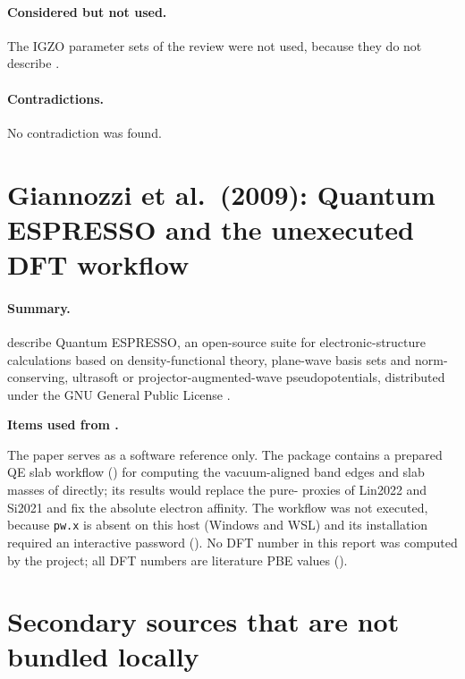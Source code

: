 \paragraph{Considered but not used.} The IGZO parameter sets of the review were not used, because
they do not describe \IWO.

\paragraph{Contradictions.} No contradiction was found.

\section{Giannozzi et al.\ (2009): Quantum ESPRESSO and the unexecuted DFT workflow}
\label{sec:lit-giannozzi2009}

\paragraph{Summary.}
\citet{Giannozzi2009} describe Quantum ESPRESSO, an open-source suite for electronic-structure
calculations \citep[p.~1]{Giannozzi2009} based on density-functional theory, plane-wave basis sets and
norm-conserving, ultrasoft or projector-augmented-wave pseudopotentials, distributed under the GNU
General Public License \citep[p.~2]{Giannozzi2009}.

\begin{usedbox}
\textbf{Items used from \citet{Giannozzi2009}.}\par\smallskip
\footnotesize
The paper serves as a software reference only. The package contains a prepared QE slab workflow
() for computing the vacuum-aligned band edges and slab masses of \IWO{} directly;
its results would replace the pure-\InO{} proxies of Lin2022 and Si2021 and fix the absolute electron
affinity. The workflow was not executed, because \texttt{pw.x} is absent on this host (Windows and
WSL) and its installation required an interactive password (). No DFT
number in this report was computed by the project; all DFT numbers are literature PBE values
().
\end{usedbox}

\section{Secondary sources that are not bundled locally}
\label{sec:lit-secondary}

